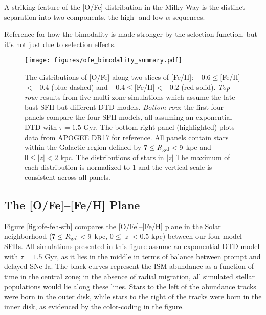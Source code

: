 \documentclass[modern,linenumbers]{aastex631}
\begin{document}
A striking feature of the [O/Fe] distribution in the Milky Way is the distinct separation into two components, the high- and low-$\alpha$ sequences. 

Reference \citet{Vincenzo2021-AlphaDistribution} for how the bimodality is made stronger by the selection function, but it's not just due to selection effects.

\begin{figure*}
    \centering
    \texttt{[image: figures/ofe\_bimodality\_summary.pdf]}
    \caption{The distributions of [O/Fe] along two slices of [Fe/H]: $-0.6\leq$[Fe/H]$<-0.4$ (blue dashed) and $-0.4\leq$[Fe/H]$<-0.2$ (red solid). \textit{Top row:} results from five multi-zone simulations which assume the late-bust SFH but different DTD models. \textit{Bottom row}: the first four panels compare the four SFH models, all assuming an exponential DTD with $\tau=1.5$ Gyr. The bottom-right panel (highlighted) plots data from APOGEE DR17 for reference. All panels contain stars within the Galactic region defined by $7\leq R_{\rm gal}<9$ kpc and $0\leq|z|<2$ kpc. The distributions of stars in $|z|$ The maximum of each distribution is normalized to 1 and the vertical scale is consistent across all panels.}
    \label{fig:ofe-bimodality}
\end{figure*}

\subsection{The [O/Fe]--[Fe/H] Plane}
\label{sec:ofe-feh}

Figure \ref{fig:ofe-feh-sfh} compares the [O/Fe]--[Fe/H] plane in the Solar neighborhood ($7\leq R_{\rm gal}<9$ kpc, $0\leq|z|<0.5$ kpc) between our four model SFHs. All simulations presented in this figure assume an exponential DTD model with $\tau=1.5$ Gyr, as it lies in the middle in terms of balance between prompt and delayed SNe Ia. The black curves represent the ISM abundance as a function of time in the central zone; in the absence of radial migration, all simulated stellar populations would lie along these lines. Stars to the left of the abundance tracks were born in the outer disk, while stars to the right of the tracks were born in the inner disk, as evidenced by the color-coding in the figure.
\end{document}
